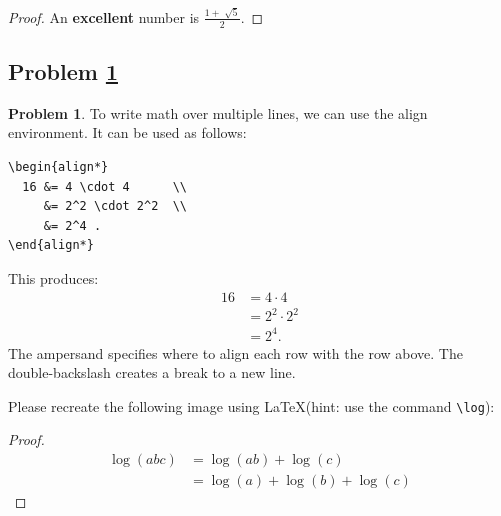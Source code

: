 \documentclass[11pt]{article}
\theoremstyle{definition}
\theoremstyle{definition}
\newtheorem{required}{Problem}
\theoremstyle{definition}
\begin{document}
\begin{proof}
An \textbf{excellent} number is $\frac{1+ \sqrt[]{5}}{2}$.
\end{proof}




\newpage
\subsection{Problem \ref{Latex4}}
\begin{required} \label{Latex4}
To write math over multiple lines, we can use the align environment.
It can be used as follows:
\begin{verbatim}
\begin{align*}
  16 &= 4 \cdot 4      \\
     &= 2^2 \cdot 2^2  \\
     &= 2^4 .
\end{align*}
\end{verbatim}
This produces:
\begin{align*}
  16 &= 4 \cdot 4      \\
     &= 2^2 \cdot 2^2  \\
     &= 2^4 .
\end{align*}
The ampersand specifies where to align each row with the row above. The double-backslash creates a break to a new line.

Please recreate the following image using \LaTeX (hint: use the command \texttt{\textbackslash log}):

\begin{center}
\end{center}
\end{required}

\begin{proof}
\begin{align*}
	\log(abc) &= \log(ab) + \log(c) \\
			  &= \log(a) + \log(b) + \log(c) 
\end{align*}
\end{proof}

\newpage
\end{document}
